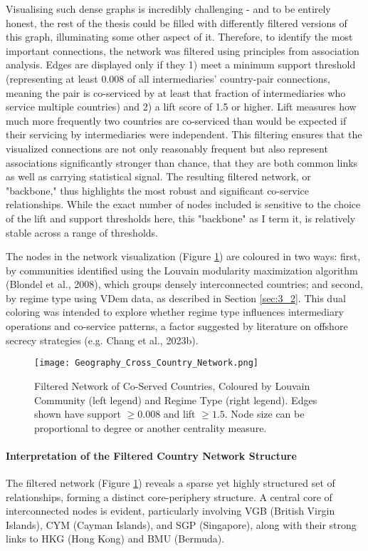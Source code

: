 Visualising such dense graphs is incredibly challenging - and to be entirely honest, the rest of the thesis could be filled with differently filtered versions of this graph, illuminating some other aspect of it. Therefore, to identify the most important connections, the network was filtered using principles from association analysis. Edges are displayed only if they 1) meet a minimum support threshold (representing at least 0.008 of all intermediaries' country-pair connections, meaning the pair is co-serviced by at least that fraction of intermediaries who service multiple countries) and 2) a lift score of 1.5 or higher. Lift measures how much more frequently two countries are co-serviced than would be expected if their servicing by intermediaries were independent. This filtering ensures that the visualized connections are not only reasonably frequent but also represent associations significantly stronger than chance, that they are both common links as well as carrying statistical signal. The resulting filtered network, or "backbone," thus highlights the most robust and significant co-service relationships. While the exact number of nodes included is sensitive to the choice of the lift and support thresholds here, this "backbone" as I term it, is relatively stable across a range of thresholds.

The nodes in the network visualization (Figure \ref{fig:geography_cross_country_network}) are coloured in two ways: first, by communities identified using the Louvain modularity maximization algorithm (Blondel et al., 2008), which groups densely interconnected countries; and second, by regime type using VDem data, as described in Section \ref{sec:3_2}. This dual coloring was intended to explore whether regime type influences intermediary operations and co-service patterns, a factor suggested by literature on offshore secrecy strategies (e.g. Chang et al., 2023b).

\begin{figure}[htbp]
    \centering
    \texttt{[image: Geography\_Cross\_Country\_Network.png]}
    \caption{Filtered Network of Co-Served Countries, Coloured by Louvain Community (left legend) and Regime Type (right legend). Edges shown have support $\ge 0.008$ and lift $\ge 1.5$. Node size can be proportional to degree or another centrality measure.}
    \label{fig:geography_cross_country_network}
\end{figure}

\paragraph{Interpretation of the Filtered Country Network Structure}
The filtered network (Figure \ref{fig:geography_cross_country_network}) reveals a sparse yet highly structured set of relationships, forming a distinct core-periphery structure. A central core of interconnected nodes is evident, particularly involving VGB (British Virgin Islands), CYM (Cayman Islands), and SGP (Singapore), along with their strong links to HKG (Hong Kong) and BMU (Bermuda).

